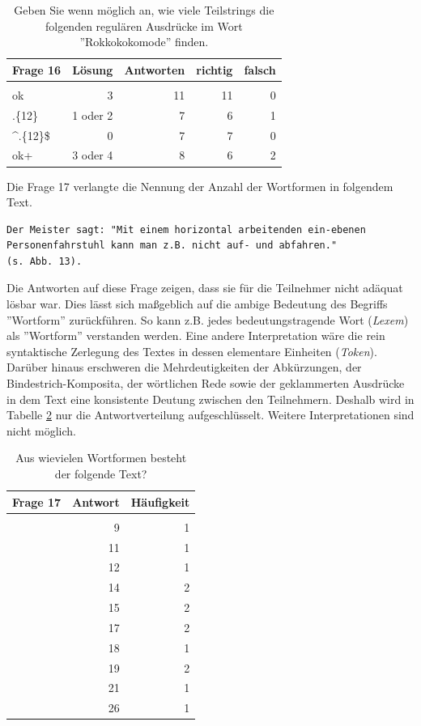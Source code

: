 	\begin{table}[H]
		\centering
		\begin{tabular}{l | r r r r}
					Frage 16 & Lösung & Antworten & richtig & falsch \\
					\hline\\
					ok	& 3 & 11 & 11 & 0 \\
					.\{12\}  & 1 oder 2  & 7 & 6  & 1 \\
					\^{}.\{12\}\$ & 0 & 7 & 7 & 0 \\
					ok+ & 3 oder 4 & 8 & 6 & 2
		\end{tabular}
		\caption{Geben Sie wenn möglich an, wie viele Teilstrings die folgenden regulären Ausdrücke im Wort ''Rokkokokomode'' finden.} \label{tab:Frage16}
	\end{table}
	
\newpage
Die Frage 17 verlangte die Nennung der Anzahl der Wortformen in folgendem Text.

\begin{verbatim}
Der Meister sagt: "Mit einem horizontal arbeitenden ein-ebenen 
Personenfahrstuhl kann man z.B. nicht auf- und abfahren." 
(s. Abb. 13).
\end{verbatim}
	
Die Antworten auf diese Frage zeigen, dass sie für die Teilnehmer nicht adäquat lösbar war. Dies lässt sich maßgeblich auf die ambige Bedeutung des Begriffs ''Wortform'' zurückführen. So kann z.B. jedes bedeutungstragende Wort (\emph{Lexem}) als ''Wortform'' verstanden werden. Eine andere Interpretation wäre die rein syntaktische Zerlegung des Textes in dessen elementare Einheiten (\emph{Token}). Darüber hinaus erschweren die Mehrdeutigkeiten der Abkürzungen, der Bindestrich-Komposita, der wörtlichen Rede sowie der geklammerten Ausdrücke in dem Text eine konsistente Deutung zwischen den Teilnehmern. Deshalb wird in Tabelle \ref{tab:Frage17} nur die Antwortverteilung aufgeschlüsselt. Weitere Interpretationen sind nicht möglich.

	\begin{table}[H]
		\centering
		\begin{tabular}{l | r r}
					Frage 17 & Antwort & Häufigkeit \\
					\hline\\
					& 9 & 1 \\
					& 11 & 1\\
					& 12 & 1 \\
					& 14 & 2 \\
					& 15 & 2 \\
					& 17 & 2  \\
					& 18 & 1  \\
					& 19 & 2 \\
					& 21 & 1 \\
					& 26 & 1
		\end{tabular}
		\caption{Aus wievielen Wortformen besteht der folgende Text? } \label{tab:Frage17}
	\end{table}	
	
